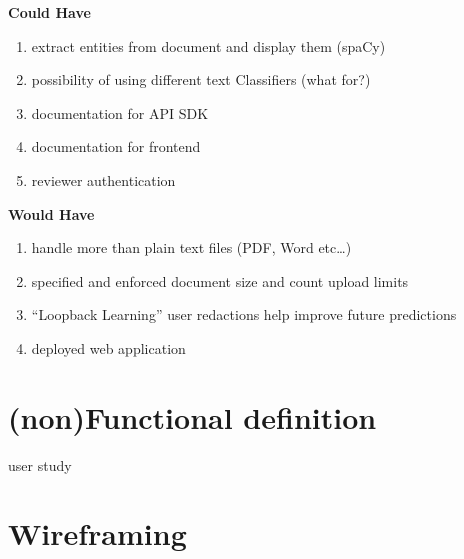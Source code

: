 \documentclass{l4proj}
\begin{document}
\begin{minipage}[t]{.5\linewidth}
    \centerline{\textbf{Could Have}}
    \begin{enumerate}[label=\textbf{C\arabic*}]
        \item extract entities from document and display them (spaCy)
        \item possibility of using different text Classifiers (what for?)
        \item documentation for API SDK
        \item documentation for frontend
        \item reviewer authentication
    \end{enumerate}
\end{minipage}
\hfill
\noindent
\begin{minipage}[t]{.5\linewidth}
    \centerline{\textbf{Would Have}}
    \begin{enumerate}[label=\textbf{W\arabic*}]
        \item handle more than plain text files (PDF, Word etc…)
        \item specified and enforced document size and count upload limits
        \item ``Loopback Learning'' user redactions help improve future predictions
        \item deployed web application
    \end{enumerate}
\end{minipage}

\section{(non)Functional definition}

user study

\section{Wireframing}
\end{document}
